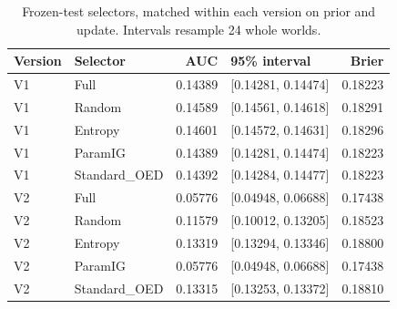 \begin{table}[tbp]
\centering\small
\setlength{\tabcolsep}{4pt}
\caption{Frozen-test selectors, matched within each version on prior and update. Intervals resample 24 whole worlds.}\label{tab:v2-selectors}
\begin{tabular}{llrlr}
\toprule
Version & Selector & AUC & 95\% interval & Brier \\
\midrule
V1 & Full & 0.14389 & [0.14281, 0.14474] & 0.18223 \\
V1 & Random & 0.14589 & [0.14561, 0.14618] & 0.18291 \\
V1 & Entropy & 0.14601 & [0.14572, 0.14631] & 0.18296 \\
V1 & ParamIG & 0.14389 & [0.14281, 0.14474] & 0.18223 \\
V1 & Standard\_OED & 0.14392 & [0.14284, 0.14477] & 0.18223 \\
V2 & Full & 0.05776 & [0.04948, 0.06688] & 0.17438 \\
V2 & Random & 0.11579 & [0.10012, 0.13205] & 0.18523 \\
V2 & Entropy & 0.13319 & [0.13294, 0.13346] & 0.18800 \\
V2 & ParamIG & 0.05776 & [0.04948, 0.06688] & 0.17438 \\
V2 & Standard\_OED & 0.13315 & [0.13253, 0.13372] & 0.18810 \\
\bottomrule
\end{tabular}
\end{table}
